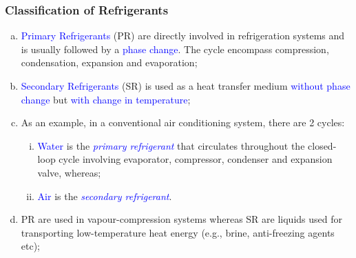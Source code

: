 \documentclass[10pt,compress,handout,ignorenonframetext]{beamer}
\begin{document}
\begin{frame}
 \frametitle{Classification of Refrigerants}
 \begin{enumerate}[(a)]
   \item <1-> \textcolor{blue}{Primary Refrigerants} (PR) are directly involved in refrigeration systems and is usually followed by a \textcolor{blue}{phase change}. The cycle encompass compression, condensation, expansion and evaporation;
   \item <2-> \textcolor{blue}{Secondary Refrigerants} (SR) is used as a heat transfer medium  \textcolor{blue}{without phase change} but \textcolor{blue}{with change in temperature};
   \item <3-> As an example, in a conventional air conditioning system, there are 2 cycles: 
    \begin{enumerate}[(i)]
     \item <4-> \textcolor{blue}{Water} is the \textcolor{blue}{{\it primary refrigerant}} that circulates throughout the closed-loop cycle involving evaporator, compressor, condenser and expansion valve, whereas;
     \item <5-> \textcolor{blue}{Air} is the \textcolor{blue}{{\it secondary refrigerant}}.
    \end{enumerate}
    \item <6-> PR are used in vapour-compression systems whereas SR are liquids used for transporting low-temperature heat energy (e.g., brine, anti-freezing agents etc);
  \end{enumerate}
\end{frame}
\end{document}
